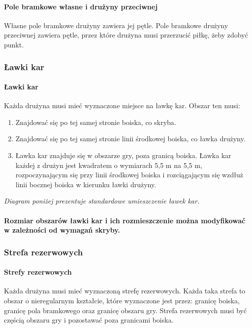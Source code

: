 \documentclass[12pt]{article}
\begin{document}
\paragraph{Pole bramkowe własne i drużyny przeciwnej}
Własne pole bramkowe drużyny zawiera jej pętle. Pole bramkowe drużyny
przeciwnej zawiera pętle, przez które drużyna musi przerzucić piłkę,
żeby zdobyć punkt.

\subsubsection{Ławki kar}

\paragraph{Ławki kar}
Każda drużyna musi mieć wyznaczone miejsce
na ławkę kar. Obszar ten musi:
\begin{enumerate}
\item Znajdować się po tej samej stronie boiska, co skryba.

\item Znajdować się po tej samej stronie linii środkowej boiska, co ławka
drużyny.

\item Ławka kar znajduje się w obszarze gry, poza granicą boiska. Ławka kar
każdej z drużyn jest kwadratem o wymiarach 5,5 m na 5,5 m,
rozpoczynającym się przy linii środkowej boiska i rozciągającym się
wzdłuż linii bocznej boiska w kierunku ławki drużyny.
\end{enumerate}

\textit{Diagram poniżej prezentuje standardowe umieszczenie ławek kar.}

\paragraph{Rozmiar obszarów ławki kar i ich rozmieszczenie można
modyfikować w zależności od wymagań skryby.}

\subsubsection{Strefa rezerwowych}

\paragraph{Strefy rezerwowych}
Każda drużyna musi mieć
wyznaczoną strefę rezerwowych. Każda taka strefa to obszar o
nieregularnym kształcie, które wyznaczone jest przez: granicę boiska,
granicę pola bramkowego oraz granicę obszaru gry. Strefa rezerwowych
musi być częścią obszaru gry i pozostawać poza granicami boiska.
\end{document}
